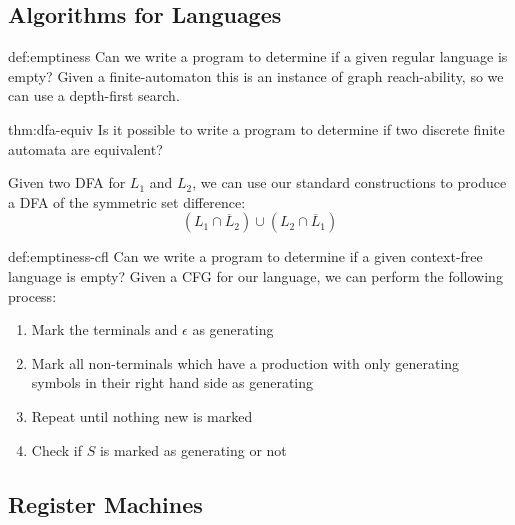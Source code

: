 \documentclass[landscape, 8pt]{extarticle}
\begin{document}
\begin{multicols}{3}
\subsection*{Algorithms for Languages}
\begin{thm}{def:emptiness}{}
Can we write a program to determine if a given regular language is empty?
\newline
Given a finite-automaton this is an instance of graph reach-ability, so we can use a depth-first search.
\end{thm}

\begin{thm}{thm:dfa-equiv}{}
Is it possible to write a program to determine if two discrete finite automata are equivalent?

Given two DFA for $L_1$ and $L_2$, we can use our standard constructions to produce a DFA of the symmetric set difference:
\[(L_1 \cap \overline L_2) \cup (L_2 \cap \overline L_1)\]
\end{thm}

\newpage

\begin{thm}{def:emptiness-cfl}{}
Can we write a program to determine if a given context-free language is empty?
\newline
Given a CFG for our language, we can perform the following process:
\begin{enumerate}
    \item Mark the terminals and $\epsilon$ as generating
    \item Mark all non-terminals which have a production with only generating symbols in their right hand side as generating
    \item Repeat until nothing new is marked
    \item Check if $S$ is marked as generating or not
\end{enumerate}
\end{thm}




\subsection*{Register Machines}


\end{multicols}
\end{document}
